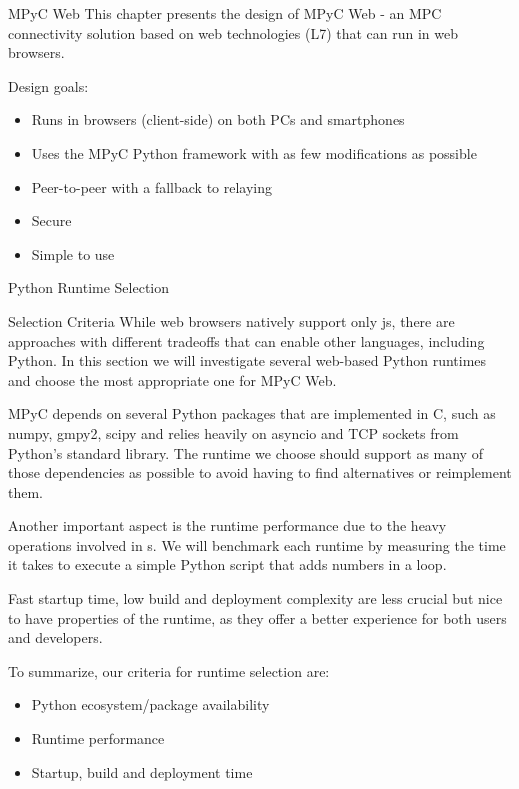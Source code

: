 \label{thesis__090-mpyc-web.md}
\begin{block}{MPyC Web}
\label{thesis__090-mpyc-web.md__mpyc-web}
This chapter presents the design of MPyC Web - an MPC connectivity solution based on web technologies (L7) that can run in web browsers.

Design goals:

\begin{itemize}
\tightlist
\item
  Runs in browsers (client-side) on both PCs and smartphones
\item
  Uses the MPyC Python framework with as few modifications as possible
\item
  Peer-to-peer with a fallback to relaying
\item
  Secure
\item
  Simple to use
\end{itemize}

\begin{block}{Python Runtime Selection}
\label{thesis__090-mpyc-web.md__python-runtime-selection}
\begin{block}{Selection Criteria}
\label{thesis__090-mpyc-web.md__selection-criteria}
While web browsers natively support only \gls{js}, there are approaches with different tradeoffs that can enable other languages, including Python. In this section we will investigate several web-based Python runtimes and choose the most appropriate one for MPyC Web.

MPyC depends on several Python packages that are implemented in C, such as numpy, gmpy2, scipy and relies heavily on asyncio and TCP sockets from Python's standard library. The runtime we choose should support as many of those dependencies as possible to avoid having to find alternatives or reimplement them.

Another important aspect is the runtime performance due to the heavy operations involved in s. We will benchmark each runtime by measuring the time it takes to execute a simple Python script that adds numbers in a loop.

Fast startup time, low build and deployment complexity are less crucial but nice to have properties of the runtime, as they offer a better experience for both users and developers.

To summarize, our criteria for runtime selection are:

\begin{itemize}
\tightlist
\item
  Python ecosystem/package availability
\item
  Runtime performance
\item
  Startup, build and deployment time
\end{itemize}
\end{block}


\end{block}
\end{block}
